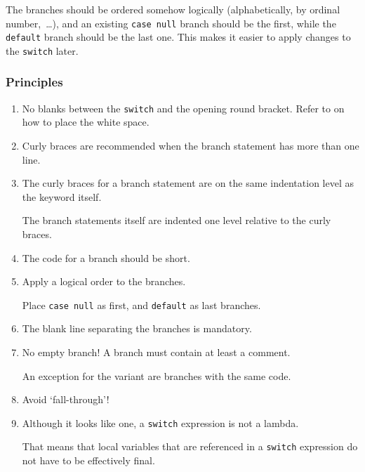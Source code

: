 The branches should be ordered somehow logically (alphabetically, by ordinal number,~…), and an existing \lstinline|case null| branch should be the first, while the \lstinline|default| branch should be the last one. This makes it easier to apply changes to the \lstinline|switch| later.

\subsubsection{Principles}
\begin{enumerate}[label=P\arabic*.]
\item{No blanks between the \lstinline|switch| and the opening round bracket. Refer to  on how to place the white space.}
\item{Curly braces are recommended when the branch statement has more than one line.}
\item{The curly braces for a branch statement are on the same indentation level as the keyword itself.

The branch statements itself are indented one level relative to the curly braces.}
\item{The code for a branch should be short.}
\item{Apply a logical order to the branches.

Place \lstinline|case null| as first, and \lstinline|default| as last branches.}
\item{The blank line separating the branches is mandatory.}
\item{No empty branch! A branch must contain at least a comment.

An exception for the  variant are branches with the same code.}
\item{Avoid ‘fall-through’!}
\item{Although it looks like one, a \lstinline|switch| expression is not a lambda.

That means that local variables that are referenced in a \lstinline|switch| expression do not have to be effectively final.}
\end{enumerate}

